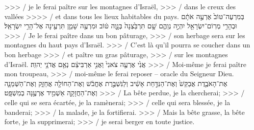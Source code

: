 \begin{paracol}[1]
{    >>> / je le ferai paître sur les montagnes d’Israël,
    >>> / dans le creux des vallées
    >>>> / et dans tous les lieux habitables du pays.}
  \verset
  {בְּמִרְעֶה־טּוֹב֙ אֶרְעֶ֣ה אֹתָ֔ם
    וּבְהָרֵ֥י מְרֽוֹם־יִשְׂרָאֵ֖ל יִהְיֶ֣ה נְוֵהֶ֑ם
    שָׁ֤ם תִּרְבַּ֙צְנָה֙ בְּנָ֣וֶה טּ֔וֹב
    וּמִרְעֶ֥ה שָׁמֵ֛ן תִּרְעֶ֖ינָה
    אֶל־הָרֵ֥י יִשְׂרָאֵֽל׃}
  {>>> / Je le ferai paître dans un bon pâturage,
    >>> / son herbage sera sur les montagnes du haut pays d’Israël.
    >>> / C’est là qu’il pourra se coucher dans un bon herbage
    >>> / et paître un gras pâturage,
    >>> / sur les montagnes d’Israël.}
  \verset
  {אֲנִ֙י אֶרְעֶ֤ה צֹאנִי֙
    וַאֲנִ֣י אַרְבִּיצֵ֔ם נְאֻ֖ם אֲדֹנָ֥י יְהוִֽה׃}
  {>>> / Moi-même je ferai paître mon troupeau,
    >>> / moi-même le ferai reposer – oracle du Seigneur Dieu.}
  \verset
  {אֶת־הָאֹבֶ֤דֶת אֲבַקֵּשׁ֙
    וְאֶת־הַנִּדַּ֣חַת אָשִׁ֔יב
    וְלַנִּשְׁבֶּ֣רֶת אֶחֱבֹ֔שׁ
    וְאֶת־הַחוֹלָ֖ה אֲחַזֵּ֑ק
    וְאֶת־הַשְּׁמֵנָ֧ה וְאֶת־הַחֲזָקָ֛ה אַשְׁמִ֖יד
    אֶרְעֶ֥נָּה בְמִשְׁפָּֽט׃}
  {>>> / La bête perdue, je la chercherai;
    >>> / celle qui se sera écartée, je la ramènerai;
    >>> / celle qui sera blessée, je la banderai;
    >>> / la malade, je la fortifierai.
    >>> / Mais la bête grasse, la bête forte, je la supprimerai;
    >>> / je serai berger en toute justice.}
  \clearpage

\end{paracol}
